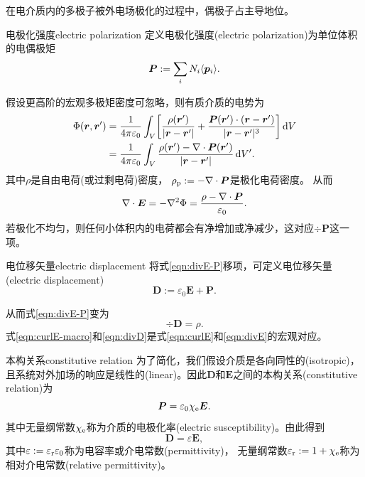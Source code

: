 在电介质内的多极子被外电场极化的过程中，偶极子占主导地位。
\begin{definition}
    {电极化强度}{electric polarization}
    定义电极化强度(electric polarization)为单位体积的电偶极矩
    \begin{equation}
        \bm P := \sum_i N_i\langle\bm p_i\rangle.
    \end{equation}
\end{definition}
假设更高阶的宏观多极矩密度可忽略，则有质介质的电势为
\begin{align}
    \notag
    \Phi(\bm r,\bm r') &= \frac1{4\pi\varepsilon_0}\int_V\biggl[\frac{\rho(\bm r')}{\lvert\bm r - \bm r'\rvert} + \frac{\bm P(\bm r') \cdot (\bm r - \bm r')}{\lvert\bm r - \bm r'\rvert^3}\biggr]\mathop{}\!\mathrm{d} V\\
    &= \frac1{4\pi\varepsilon_0}\int_V\frac{\rho(\bm r') - \nabla\cdot\bm P(\bm r')}{\lvert\bm r - \bm r'\rvert}\mathop{}\!\mathrm{d} V'.
\end{align}
其中$\rho$是自由电荷(或过剩电荷)密度，
$\rho_\mathrm p := -\nabla\cdot\bm P$是极化电荷密度。%
从而
\begin{equation}
    \label{eqn:divE-P}
    \nabla\cdot\bm E = -\nabla^2\Phi = \frac{\rho - \nabla\cdot\bm P}{\varepsilon_0}.
\end{equation}
若极化不均匀，则任何小体积内的电荷都会有净增加或净减少，这对应$\div\bm P$这一项。
\begin{definition}
    {电位移矢量}{electric displacement}
    将式\eqref{eqn:divE-P}移项，可定义电位移矢量(electric displacement)
    \begin{equation}
        \bm D := \varepsilon_0\bm E + \bm P.
    \end{equation}
\end{definition}
从而式\eqref{eqn:divE-P}变为 
\begin{equation}
    \label{eqn:divD}
    \div\bm D = \rho.
\end{equation}
式\eqref{eqn:curlE-macro}和\eqref{eqn:divD}是式\eqref{eqn:curlE}和\eqref{eqn:divE}的宏观对应。

\begin{definition}
    {本构关系}{constitutive relation}
    为了简化，我们假设介质是各向同性的(isotropic)，且系统对外加场的响应是线性的(linear)。因此$\bm D$和$\bm E$之间的本构关系(constitutive relation)为
    \begin{equation}
        \bm P = \varepsilon_0\chi_\mathrm e\bm E.
    \end{equation}
    其中无量纲常数$\chi_\mathrm e$称为介质的电极化率(electric susceptibility)。由此得到
    \begin{equation}
        \bm D = \varepsilon\bm E,
    \end{equation}
    其中$\varepsilon := \varepsilon_\mathrm r\varepsilon_0$称为电容率或介电常数(permittivity)，
    无量纲常数$\varepsilon_\mathrm r := 1 + \chi_\mathrm e$称为相对介电常数(relative permittivity)。
\end{definition}

